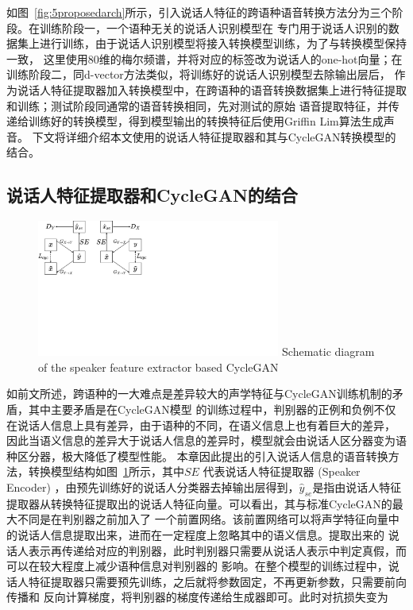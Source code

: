 如图~\ref{fig:5proposedarch}所示，引入说话人特征的跨语种语音转换方法分为三个阶段。在训练阶段一，一个语种无关的说话人识别模型在
专门用于说话人识别的数据集上进行训练，由于说话人识别模型将接入转换模型训练，为了与转换模型保持一致，
这里使用80维的梅尔频谱，并将对应的标签改为说话人的one-hot向量；在训练阶段二，同d-vector方法类似，将训练好的说话人识别模型去除输出层后，
作为说话人特征提取器加入转换模型中，在跨语种的语音转换数据集上进行特征提取和训练；测试阶段同通常的语音转换相同，先对测试的原始
语音提取特征，并传递给训练好的转换模型，得到模型输出的转换特征后使用Griffin Lim算法生成声音。
下文将详细介绍本文使用的说话人特征提取器和其与CycleGAN转换模型的结合。



\subsection{说话人特征提取器和CycleGAN的结合}

\begin{figure}[!htp]
    \centering
    \includegraphics[width=8cm,trim=0 230 370 0,clip]{figure/5_dvectorcyclegan.pdf}
    {Schematic diagram of the speaker feature extractor based CycleGAN}
    \label{fig:dvectorcyclegan}
\end{figure}

如前文所述，跨语种的一大难点是差异较大的声学特征与CycleGAN训练机制的矛盾，其中主要矛盾是在CycleGAN模型
的训练过程中，判别器的正例和负例不仅在说话人信息上具有差异，由于语种的不同，在语义信息上也有着巨大的差异，
因此当语义信息的差异大于说话人信息的差异时，模型就会由说话人区分器变为语种区分器，极大降低了模型性能。
本章因此提出的引入说话人信息的语音转换方法，转换模型结构如图~\ref{fig:dvectorcyclegan}所示，其中$SE$
代表说话人特征提取器 (Speaker Encoder) ，由预先训练好的说话人分类器去掉输出层得到，$\hat{y}_{se}$是指由说话人特征
提取器从转换特征提取出的说话人特征向量。可以看出，其与标准CycleGAN的最大不同是在判别器之前加入了
一个前置网络。该前置网络可以将声学特征向量中的说话人信息提取出来，进而在一定程度上忽略其中的语义信息。提取出来的
说话人表示再传递给对应的判别器，此时判别器只需要从说话人表示中判定真假，而可以在较大程度上减少语种信息对判别器的
影响。在整个模型的训练过程中，说话人特征提取器只需要预先训练，之后就将参数固定，不再更新参数，只需要前向传播和
反向计算梯度，将判别器的梯度传递给生成器即可。此时对抗损失变为


